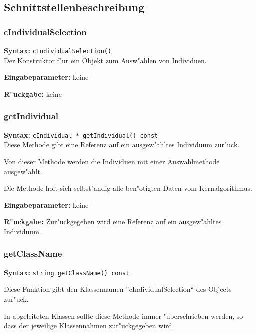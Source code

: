 \subsection{Schnittstellenbeschreibung}

\subsubsection{cIndividualSelection}

\textbf{Syntax:} \verb|cIndividualSelection()| \\

Der Konstruktor f"ur ein Objekt zum Ausw"ahlen von Individuen.

\bigskip\noindent
\textbf{Eingabeparameter:} keine

\bigskip\noindent
\textbf{R"uckgabe:} keine


\subsubsection{getIndividual}

\textbf{Syntax:} \verb|cIndividual * getIndividual() const| \\

Diese Methode gibt eine Referenz auf ein ausgew"ahltes Individuum zur"uck.

Von dieser Methode werden die Individuen mit einer Auswahlmethode ausgew"ahlt.

Die Methode holt sich selbst"andig alle ben"otigten Daten vom Kernalgorithmus.

\bigskip\noindent
\textbf{Eingabeparameter:} keine

\bigskip\noindent
\textbf{R"uckgabe:} Zur"uckgegeben wird eine Referenz auf ein ausgew"ahltes Individuum.


\subsubsection{getClassName}

\textbf{Syntax:} \verb|string getClassName() const|

\bigskip\noindent
Diese Funktion gibt den Klassennamen ''cIndividualSelection`` des Objects zur"uck.

In abgeleiteten Klassen sollte diese Methode immer "uberschrieben werden, so dass der jeweilige Klassennahmen zur"uckgegeben wird.

